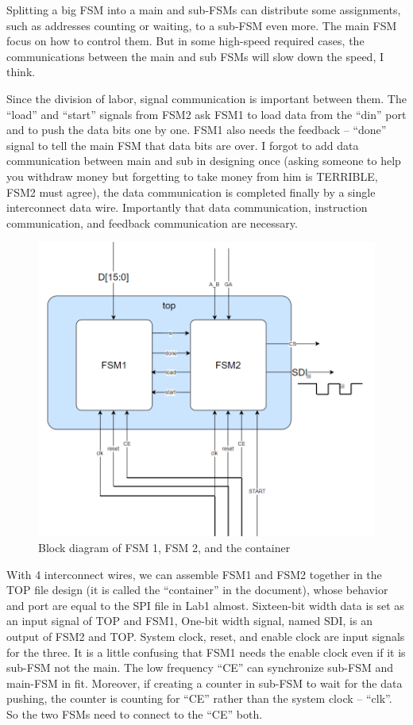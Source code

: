 \documentclass[a4paper]{article}
\begin{document}
Splitting a big FSM into a main and sub-FSMs can distribute some assignments, such as addresses counting or waiting, to a sub-FSM even more. The main FSM focus on how to control them. But in some high-speed required cases, the communications between the main and sub FSMs will slow down the speed, I think.


Since the division of labor, signal communication is important between them. The “load” and “start” signals from FSM2 ask FSM1 to load data from the “din” port and to push the data bits one by one. FSM1 also needs the feedback -- “done” signal to tell the main FSM that data bits are over. I forgot to add data communication between main and sub in designing once (asking someone to help you withdraw money but forgetting to take money from him is TERRIBLE, FSM2 must agree), the data communication is completed finally by a single interconnect data wire. Importantly that data communication, instruction communication, and feedback communication are necessary.





\begin{figure}[h]
\centering
\includegraphics[width=1\textwidth]{fig11.png}
\caption{\label{fig:data}Block diagram of FSM 1, FSM 2, and the container}
\end{figure}

With 4 interconnect wires, we can assemble FSM1 and FSM2 together in the TOP file design (it is called the “container” in the document), whose behavior and port are equal to the SPI file in Lab1 almost. Sixteen-bit width data is set as an input signal of TOP and FSM1, One-bit width signal, named SDI, is an output of FSM2 and TOP. System clock, reset, and enable clock are input signals for the three. It is a little confusing that FSM1 needs the enable clock even if it is sub-FSM not the main. The low frequency “CE” can synchronize sub-FSM and main-FSM in fit. Moreover, if creating a counter in sub-FSM to wait for the data pushing, the counter is counting for “CE” rather than the system clock – “clk”. So the two FSMs need to connect to the “CE” both.
\end{document}

